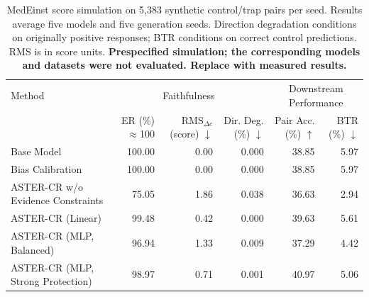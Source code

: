 \begin{table}[t]
\centering
\small
\setlength{\tabcolsep}{3pt}
\begin{tabularx}{\textwidth}{@{}>{\raggedright\arraybackslash}Xrrrrr@{}}
\toprule
Method & \multicolumn{3}{c}{Faithfulness} & \multicolumn{2}{c}{Downstream Performance} \\
\cmidrule(lr){2-4}\cmidrule(lr){5-6}
 & \shortstack{ER\\ (\%) $\approx$100} & \shortstack{$\mathrm{RMS}_{\Delta c}$\\ (score) $\downarrow$} & \shortstack{Dir. Deg.\\ (\%) $\downarrow$} & \shortstack{Pair Acc.\\ (\%) $\uparrow$} & \shortstack{BTR\\ (\%) $\downarrow$} \\
\midrule
Base Model & 100.00 & 0.00 & 0.000 & 38.85 & 5.97 \\
Bias Calibration & 100.00 & 0.00 & 0.000 & 38.85 & 5.97 \\
ASTER-CR w/o Evidence Constraints & 75.05 & 1.86 & 0.038 & 36.63 & 2.94 \\
ASTER-CR (Linear) & 99.48 & 0.42 & 0.000 & 39.63 & 5.61 \\
ASTER-CR (MLP, Balanced) & 96.94 & 1.33 & 0.009 & 37.29 & 4.42 \\
ASTER-CR (MLP, Strong Protection) & 98.97 & 0.71 & 0.001 & 40.97 & 5.06 \\
\bottomrule
\end{tabularx}
\caption{MedEinst score simulation on 5,383 synthetic control/trap pairs per seed. Results average five models and five generation seeds. Direction degradation conditions on originally positive responses; BTR conditions on correct control predictions. RMS is in score units. \textbf{Prespecified simulation; the corresponding models and datasets were not evaluated. Replace with measured results.}}
\label{tab:aster-main-15}
\end{table}

